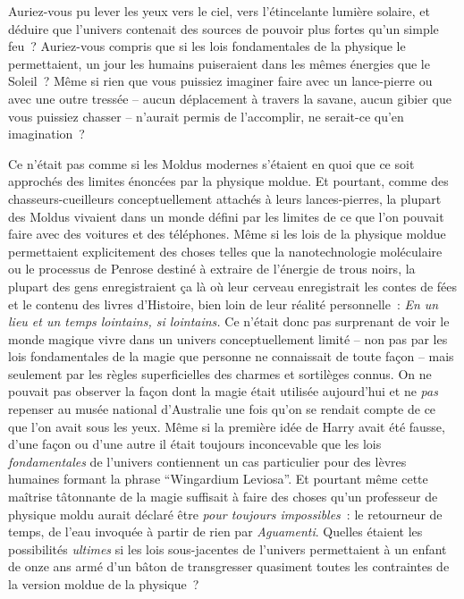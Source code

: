 Auriez-vous pu lever les yeux vers le ciel, vers l'étincelante lumière solaire, et déduire que l'univers contenait des sources de pouvoir plus fortes qu'un simple feu~?
Auriez-vous compris que si les lois fondamentales de la physique le permettaient, un jour les humains puiseraient dans les mêmes énergies que le Soleil~?
Même si rien que vous puissiez imaginer faire avec un lance-pierre ou avec une outre tressée -- aucun déplacement à travers la savane, aucun gibier que vous puissiez chasser -- n'aurait permis de l'accomplir, ne serait-ce qu'en imagination~?

Ce n'était pas comme si les Moldus modernes s'étaient en quoi que ce soit approchés des limites énoncées par la physique moldue.
Et pourtant, comme des chasseurs-cueilleurs conceptuellement attachés à leurs lances-pierres, la plupart des Moldus vivaient dans un monde défini par les limites de ce que l'on pouvait faire avec des voitures et des téléphones.
Même si les lois de la physique moldue permettaient explicitement des choses telles que la nanotechnologie moléculaire ou le processus de Penrose destiné à extraire de l'énergie de trous noirs, la plupart des gens enregistraient ça là où leur cerveau enregistrait les contes de fées et le contenu des livres d'Histoire, bien loin de leur réalité personnelle~: \emph{En un lieu et un temps lointains, si lointains.} Ce n'était donc pas surprenant de voir le monde magique vivre dans un univers conceptuellement limité -- non pas par les lois fondamentales de la magie que personne ne connaissait de toute façon -- mais seulement par les règles superficielles des charmes et sortilèges connus.
On ne pouvait pas observer la façon dont la magie était utilisée aujourd'hui et ne \emph{pas} repenser au musée national d'Australie une fois qu'on se rendait compte de ce que l'on avait sous les yeux.
Même si la première idée de Harry avait été fausse, d'une façon ou d'une autre il était toujours inconcevable que les lois \emph{fondamentales} de l'univers contiennent un cas particulier pour des lèvres humaines formant la phrase “Wingardium Leviosa”.
Et pourtant même cette maîtrise tâtonnante de la magie suffisait à faire des choses qu'un professeur de physique moldu aurait déclaré être \emph{pour toujours impossibles}~: le retourneur de temps, de l'eau invoquée à partir de rien par \emph{Aguamenti}.
Quelles étaient les possibilités \emph{ultimes} si les lois sous-jacentes de l'univers permettaient à un enfant de onze ans armé d'un bâton de transgresser quasiment toutes les contraintes de la version moldue de la physique~?

